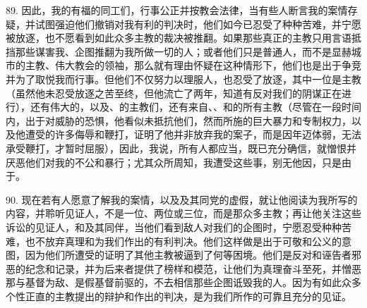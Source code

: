 89. 因此，我的有福的同工们，行事公正并按教会法律，当有些人断言我的案情存疑，并试图强迫他们撤销对我有利的判决时，他们如今已忍受了种种苦难，并宁愿被放逐，也不愿看到如此众多主教的裁决被推翻。如果那些真正的主教只用言语抵挡那些谋害我、企图推翻为我所做一切的人；或者他们只是普通人，而不是显赫城市的主教、伟大教会的领袖，那么就有理由怀疑在这种情形下，他们也是出于争竞并为了取悦我而行事。但他们不仅努力以理服人，也忍受了放逐，其中一位是主教（虽然他未忍受放逐之苦至终，但他流亡了两年，知道有反对我们的阴谋正在进行），还有伟大的，以及、的主教们，还有来自、、和的所有主教（尽管在一段时间内，出于对威胁的恐惧，他看似未抵抗他们，然而所施的巨大暴力和专制权力，以及他遭受的许多侮辱和鞭打，证明了他并非放弃我的案子，而是因年迈体弱，无法承受鞭打，才暂时屈服），因此，我说，所有人都应当，既已充分确信，就憎恨并厌恶他们对我的不公和暴行；尤其众所周知，我遭受这些事，别无他因，只是由于。\par

90. 现在若有人愿意了解我的案情，以及及其同党的虚假，就让他阅读为我所写的内容，并聆听见证人，不是一位、两位或三位，而是那众多主教；再让他关注这些诉讼的见证人，和及其同伴，当他们看到敌人对我们的企图时，宁愿忍受种种苦难，也不放弃真理和为我们作出的有利判决。他们这样做是出于可敬和公义的意图，因为他们所遭受的证明了其他主教被逼到了何等困境。他们是反对和诬告者邪恶的纪念和记录，并为后来者提供了榜样和模范，让他们为真理奋斗至死，并憎恶那与基督为敌、是假基督前驱的，不去相信那些企图诋毁我的人。因为有如此众多个性正直的主教提出的辩护和作出的判决，是为我们所作的可靠且充分的见证。\par

